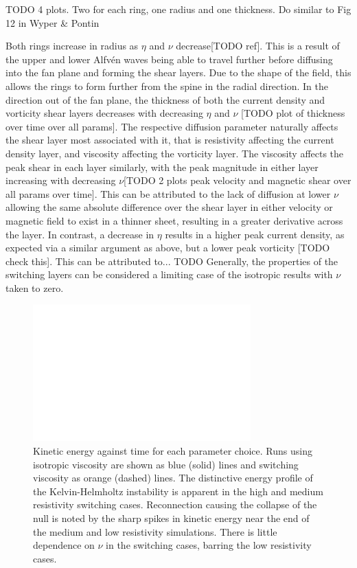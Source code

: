TODO 4 plots. Two for each ring, one radius and one thickness. Do similar to Fig 12 in Wyper \& Pontin

Both rings increase in radius as $\eta$ and $\nu$ decrease[TODO ref]. This is a result of the upper and lower Alfv\'en waves being able to travel further before diffusing into the fan plane and forming the shear layers. Due to the shape of the field, this allows the rings to form further from the spine in the radial direction. In the direction out of the fan plane, the thickness of both the current density and vorticity shear layers decreases with decreasing $\eta$ and $\nu$ [TODO plot of thickness over time over all params]. The respective diffusion parameter naturally affects the shear layer most associated with it, that is resistivity affecting the current density layer, and viscosity affecting the vorticity layer. The viscosity affects the peak shear in each layer similarly, with the peak magnitude in either layer increasing with decreasing $\nu$[TODO 2 plots peak velocity and magnetic shear over all params over time]. This can be attributed to the lack of diffusion at lower $\nu$ allowing the same absolute difference over the shear layer in either velocity or magnetic field to exist in a thinner sheet, resulting in a greater derivative across the layer. In contrast, a decrease in $\eta$ results in a higher peak current density, as expected via a similar argument as above, but a lower peak vorticity [TODO check this]. This can be attributed to... TODO Generally, the properties of the switching layers can be considered a limiting case of the isotropic results with $\nu$ taken to zero.

\begin{figure}[h]
  \centering
  \includegraphics[width=0.8\linewidth]{param_study/kinetic_energies.pdf}
  \caption{Kinetic energy against time for each parameter choice. Runs using isotropic viscosity are shown as blue (solid) lines and switching viscosity as orange (dashed) lines. The distinctive energy profile of the Kelvin-Helmholtz instability is apparent in the high and medium resistivity switching cases. Reconnection causing the collapse of the null is noted by the sharp spikes in kinetic energy near the end of the medium and low resistivity simulations. There is little dependence on $\nu$ in the switching cases, barring the low resistivity cases.}%
  \label{fig:param_study_kinetic_energies}
\end{figure}

